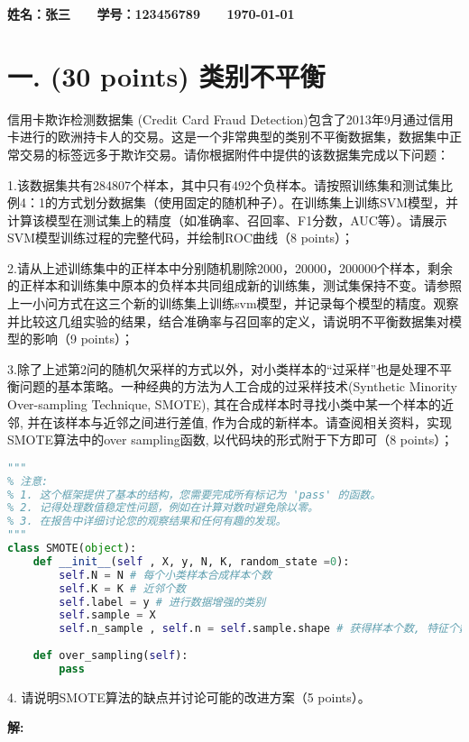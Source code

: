 \documentclass[8pt]{article}
\begin{document}
\textbf{\color{blue} \Large 姓名：张三 \ \ \ 学号：123456789 \ \ \ \today}


\section*{一. (30 points) 类别不平衡}

信用卡欺诈检测数据集 (Credit Card Fraud Detection)包含了2013年9月通过信用卡进行的欧洲持卡人的交易。这是一个非常典型的类别不平衡数据集，数据集中正常交易的标签远多于欺诈交易。请你根据附件中提供的该数据集完成以下问题：


1.该数据集共有284807个样本，其中只有492个负样本。请按照训练集和测试集比例4：1的方式划分数据集（使用固定的随机种子）。在训练集上训练SVM模型，并计算该模型在测试集上的精度（如准确率、召回率、F1分数，AUC等）。请展示SVM模型训练过程的完整代码，并绘制ROC曲线（8 points）；

2.请从上述训练集中的正样本中分别随机剔除2000，20000，200000个样本，剩余的正样本和训练集中原本的负样本共同组成新的训练集，测试集保持不变。请参照上一小问方式在这三个新的训练集上训练svm模型，并记录每个模型的精度。观察并比较这几组实验的结果，结合准确率与召回率的定义，请说明不平衡数据集对模型的影响（9 points）；

3.除了上述第2问的随机欠采样的方式以外，对小类样本的“过采样”也是处理不平衡问题的基本策略。一种经典的方法为人工合成的过采样技术(Synthetic Minority Over-sampling Technique, SMOTE), 其在合成样本时寻找小类中某一个样本的近邻, 并在该样本与近邻之间进行差值, 作为合成的新样本。请查阅相关资料，实现SMOTE算法中的over sampling函数, 以代码块的形式附于下方即可（8 points）；

\begin{lstlisting}[breaklines=true, language=Python, caption=SMOTE模型接口]
"""
% 注意:
% 1. 这个框架提供了基本的结构，您需要完成所有标记为 'pass' 的函数。
% 2. 记得处理数值稳定性问题，例如在计算对数时避免除以零。
% 3. 在报告中详细讨论您的观察结果和任何有趣的发现。
"""
class SMOTE(object):
    def __init__(self , X, y, N, K, random_state =0):
        self.N = N # 每个小类样本合成样本个数
        self.K = K # 近邻个数
        self.label = y # 进行数据增强的类别
        self.sample = X
        self.n_sample , self.n = self.sample.shape # 获得样本个数, 特征个数
    
    def over_sampling(self):
        pass
\end{lstlisting}

4. 请说明SMOTE算法的缺点并讨论可能的改进方案（5 points）。

\textbf{\large 解:}
\end{document}
